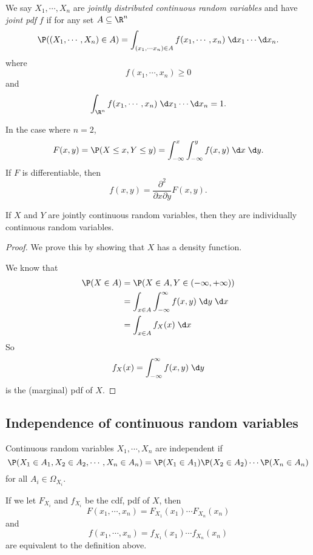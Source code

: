 \documentclass[a4paper]{article}
\begin{document}
\begin{defi}
  We say $X_1, \cdots, X_n$ are \emph{jointly distributed continuous random variables} and have \emph{joint pdf} $f$ if for any set $A\subseteq \R^n$
  \[
    \P((X_1, \cdots, X_n)\in A) = \int_{(x_1, \cdots x_n)\in A} f(x_1, \cdots, x_n)\;\d x_1\cdots \d x_n.
  \]
  where
  \[
    f(x_1, \cdots, x_n) \geq 0
  \]
  and
  \[
    \int_{\R^n} f(x_1, \cdots, x_n)\;\d x_1 \cdots \d x_n = 1.
  \]
\end{defi}

\begin{eg}
  In the case where $n = 2$,
  \[
    F(x, y) = \P(X \leq x,Y \leq y) = \int_{-\infty}^x\int_{-\infty}^y f(x, y)\;\d x\;\d y.
  \]
  If $F$ is differentiable, then
  \[
    f(x, y) = \frac{\partial^2}{\partial x\partial y}F(x, y).
  \]
\end{eg}

\begin{thm}
  If $X$ and $Y$ are jointly continuous random variables, then they are individually continuous random variables.
\end{thm}

\begin{proof}
  We prove this by showing that $X$ has a density function.

  We know that
  \begin{align*}
    \P(X \in A) &= \P(X \in A, Y\in (-\infty, +\infty))\\
    &= \int_{x\in A}\int_{-\infty}^\infty f(x, y)\;\d y\;\d x\\
    &= \int_{x\in A} f_X(x)\;\d x
  \end{align*}
  So
  \[
    f_X(x) = \int_{-\infty}^\infty f(x, y)\;\d y
  \]
  is the (marginal) pdf of $X$.
\end{proof}

\subsection{Independence of continuous random variables}
\begin{defi}
  Continuous random variables $X_1, \cdots, X_n$ are independent if
  \[
    \P(X_1\in A_1, X_2 \in A_2, \cdots, X_n\in A_n) = \P(X_1 \in A_1)\P(X_2 \in A_2) \cdots \P(X_n \in A_n)
  \]
  for all $A_i\in \Omega_{X_i}$.
  
  If we let $F_{X_i}$ and $f_{X_i}$ be the cdf, pdf of $X$, then
  \[
    F(x_1, \cdots, x_n) = F_{X_1}(x_1)\cdots F_{X_n}(x_n)
  \]
  and
  \[
    f(x_1, \cdots, x_n) = f_{X_1}(x_1) \cdots f_{X_n}(x_n)
  \]
  are equivalent to the definition above.
\end{defi}
\end{document}
